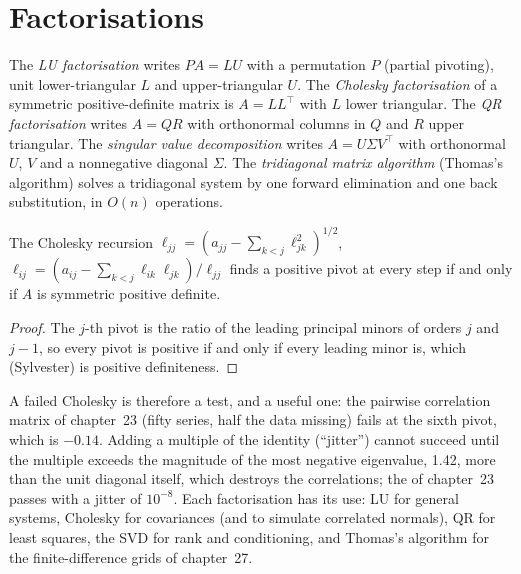 \section{Factorisations}

\begin{definition}\label{def:qm:floating-point-and-numerical-linear-algebra:factor}
The \emph{LU factorisation} writes $PA = LU$ with a permutation $P$ (partial pivoting), unit lower-triangular $L$ and upper-triangular $U$. The \emph{Cholesky
factorisation} of a symmetric positive-definite matrix is $A = LL^\top$ with $L$ lower triangular. The \emph{QR factorisation} writes $A = QR$ with
orthonormal columns in $Q$ and $R$ upper triangular. The \emph{singular value decomposition} writes $A = U\Sigma V^\top$ with orthonormal $U$, $V$ and a nonnegative
diagonal $\Sigma$. The \emph{tridiagonal matrix algorithm} (Thomas's algorithm) solves a tridiagonal system by one forward elimination and one back
substitution, in $O(n)$ operations.
\end{definition}

\begin{proposition}\label{prop:qm:floating-point-and-numerical-linear-algebra:chol}
The Cholesky recursion $\ell_{jj} = (a_{jj} - \sum_{k<j}\ell_{jk}^2)^{1/2}$, $\ell_{ij} = (a_{ij} - \sum_{k<j}\ell_{ik}\ell_{jk})/\ell_{jj}$ finds a positive pivot at every step if and only if $A$ is
symmetric positive definite.
\end{proposition}

\begin{proof}
The $j$-th pivot is the ratio of the leading principal minors of orders $j$ and $j - 1$, so every pivot is positive if and only if every leading minor is, which (Sylvester) is positive
definiteness.
\end{proof}

A failed Cholesky is therefore a test, and a useful one: the pairwise correlation matrix of chapter~23 (fifty series, half the data missing) fails at the sixth pivot, which is $-0.14$. Adding a
multiple of the identity (``jitter'') cannot succeed until the multiple exceeds the magnitude of the most negative eigenvalue, 1.42, more than the unit diagonal itself, which destroys the correlations; the  of chapter~23 passes with a jitter of
$10^{-8}$. Each factorisation has its use: LU for general systems, Cholesky for covariances (and to simulate correlated normals), QR for least squares, the SVD for rank and conditioning, and
Thomas's algorithm for the finite-difference grids of chapter~27.

